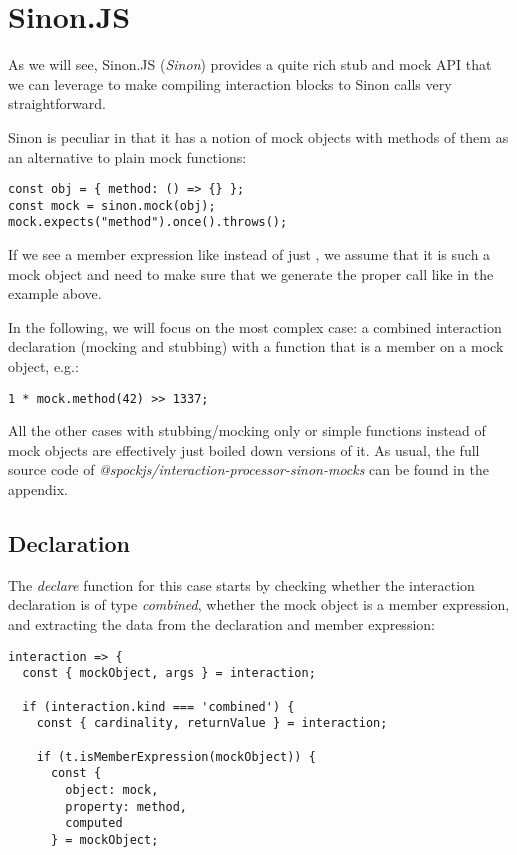 \section{Sinon.JS}
As we will see,
Sinon.JS (\textit{Sinon}) provides a
quite rich stub and mock API
that we can leverage to make
compiling interaction blocks
to Sinon calls very straightforward.

Sinon is peculiar in that it has a notion of
mock objects with methods of them
as an alternative to plain mock functions:
\autocite{SinonMockDoc}
\begin{verbatim}
const obj = { method: () => {} };
const mock = sinon.mock(obj);
mock.expects("method").once().throws();
\end{verbatim}
If we see a member expression like
instead of just
,
we assume that it is such a mock object
and need to make sure that
we generate the proper  call
like in the example above.

In the following,
we will focus on the most complex case:
a combined interaction declaration
(mocking and stubbing) with a
function that is a member on a mock object, e.g.:
\begin{verbatim}
1 * mock.method(42) >> 1337;
\end{verbatim}
All the other cases with
stubbing/mocking only
or simple functions
instead of mock objects
are effectively just
boiled down versions of it.
As usual, the full source code of
\textit{@spockjs/interaction-processor-sinon-mocks}
can be found in the appendix.

\subsection{Declaration}
The \textit{declare} function for this case starts by
checking whether the interaction declaration is of type \textit{combined},
whether the mock object is a member expression, and
extracting the data from the declaration and member expression:
\begin{verbatim}
interaction => {
  const { mockObject, args } = interaction;

  if (interaction.kind === 'combined') {
    const { cardinality, returnValue } = interaction;

    if (t.isMemberExpression(mockObject)) {
      const {
        object: mock,
        property: method,
        computed
      } = mockObject;
\end{verbatim}

